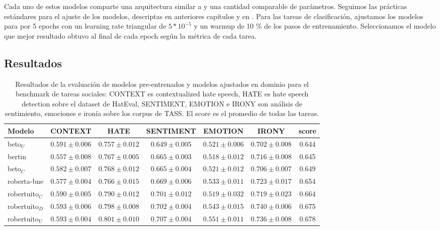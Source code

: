 Cada uno de estos modelos comparte una arquitectura similar a \robertuito{} y una cantidad comparable de parámetros. Seguimos las prácticas estándares para el ajuste de los modelos, descriptas en anteriores capítulos y en \citet{devlin2018bert}. Para las tareas de clasificación, ajustamos los modelos para por 5 epochs con un learning rate triangular de $5 * 10^{-5}$ y un warmup de 10 \% de los pasos de entrenamiento. Seleccionamos el modelo que mejor resultado obtuvo al final de cada epoch según la métrica de cada tarea.

\subsection{Resultados}


\begin{table}
    \centering
    \footnotesize
    \begin{tabular}{l ccccc c}
        Modelo             & CONTEXT             &  HATE             &  SENTIMENT        &  EMOTION          &  IRONY            &     score \\
        \hline
        beto$_U$       & $0.591 \pm 0.006$ &  $0.757 \pm 0.012$ & $0.649 \pm 0.005$ & $0.521 \pm 0.006$ & $0.702 \pm 0.008$ &  0.644 \\
        bertin             & $0.557 \pm 0.008$ &  $0.767 \pm 0.005$ & $0.665 \pm 0.003$ & $0.518 \pm 0.012$ & $0.716 \pm 0.008$ &  0.645 \\
        beto$_C$         & $0.582 \pm 0.007$ &  $0.768 \pm 0.012$ & $0.665 \pm 0.004$ & $0.521 \pm 0.012$ & $0.706 \pm 0.007$ &  0.649 \\
        roberta-bne        & $0.577 \pm 0.004$ &  $0.766 \pm 0.015$ & $0.669 \pm 0.006$ & $0.533 \pm 0.011$ & $0.723 \pm 0.017$ &  0.654 \\
        \hline
        robertuito$_C$   & $0.590 \pm 0.005$ &  $0.790 \pm 0.012$ & $0.701 \pm 0.012$ & $0.519 \pm 0.032$ & $0.719 \pm 0.023$ &  0.664 \\
        robertuito$_D$   & $0.593 \pm 0.006$ &  $0.798 \pm 0.008$ & $0.702 \pm 0.004$ & $0.543 \pm 0.015$ & $0.740 \pm 0.006$ &  0.675 \\
        robertuito$_U$ & $0.593 \pm 0.004$ &  $0.801 \pm 0.010$ & $0.707 \pm 0.004$ & $0.551 \pm 0.011$ & $0.736 \pm 0.008$ &  0.678 \\
        \hline
    \end{tabular}
    \caption{Resultados de la evaluación de modelos pre-entrenados y modelos ajustados en dominio para el benchmark de tareas sociales: CONTEXT es contextualized hate speech, HATE es hate speech detection sobre el dataset de HatEval, SENTIMENT, EMOTION e IRONY son análisis de sentimiento, emociones e ironía sobre los corpus de TASS. El score es el promedio de todas las tareas.}
    \label{tab:robertuito_evaluation_results}
\end{table}


